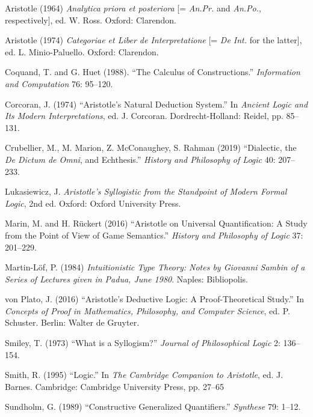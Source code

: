 \documentclass{article}
\def\AnPr/{\emph{An.Pr.}}
\def\AnPo/{\emph{An.Po.}}
\def\DeInterp/{\emph{De Int.}}
\begin{document}
\newpage

\begin{thebibliography}{99}

  Aristotle (1964)
  \emph{Analytica priora et posteriora} [= \AnPr/ and \AnPo/, respectively],
  ed. W. Ross.
  Oxford: Clarendon.

  Aristotle (1974)
  \emph{Categoriae et Liber de Interpretatione} [= \DeInterp/ for the latter],
  ed. L. Minio-Paluello.
  Oxford: Clarendon.

  Coquand, T. and G. Huet (1988).
  ``The Calculus of Constructions.'' 
  \emph{Information and Computation} 76: 95--120.

  Corcoran, J. (1974)
  ``Aristotle's Natural Deduction System.''
  In \emph{Ancient Logic and Its Modern Interpretations}, ed. J. Corcoran.
  Dordrecht-Holland: Reidel, pp. 85--131.
  
  Crubellier, M., M. Marion, Z. McConaughey, S. Rahman (2019)
  ``Dialectic, the \emph{De Dictum de Omni}, and Echthesis.''
  \emph{History and Philosophy of Logic} 40: 207--233.

  Lukasiewicz, J.
  \emph{Aristotle's Syllogistic from the Standpoint of Modern Formal Logic}, 2nd ed.
  Oxford: Oxford University Press.

  Marin, M. and H. R\"uckert (2016)
  ``Aristotle on Universal Quantification: A Study from the Point of View of Game Semantics.''
  \emph{History and Philosophy of Logic} 37: 201--229.

  Martin-L\"of, P. (1984)
  \emph{Intuitionistic Type Theory: Notes by Giovanni Sambin of a Series of Lectures given in Padua, June 1980}.
  Naples: Bibliopolis.
  
  von Plato, J. (2016)
  ``Aristotle's Deductive Logic: A Proof-Theoretical Study.''
  In \emph{Concepts of Proof in Mathematics, Philosophy, and Computer Science},
  ed. P. Schuster. Berlin: Walter de Gruyter.

  Smiley, T. (1973)
  ``What is a Syllogism?''
  \emph{Journal of Philosophical Logic} 2: 136--154.

  Smith, R. (1995)
  ``Logic.'' 
  In \emph{The Cambridge Companion to Aristotle}, ed. J. Barnes.
  Cambridge: Cambridge University Press, pp. 27--65

  Sundholm, G. (1989)
  ``Constructive Generalized Quantifiers.''
  \emph{Synthese} 79: 1--12.

\end{thebibliography}
\end{document}
